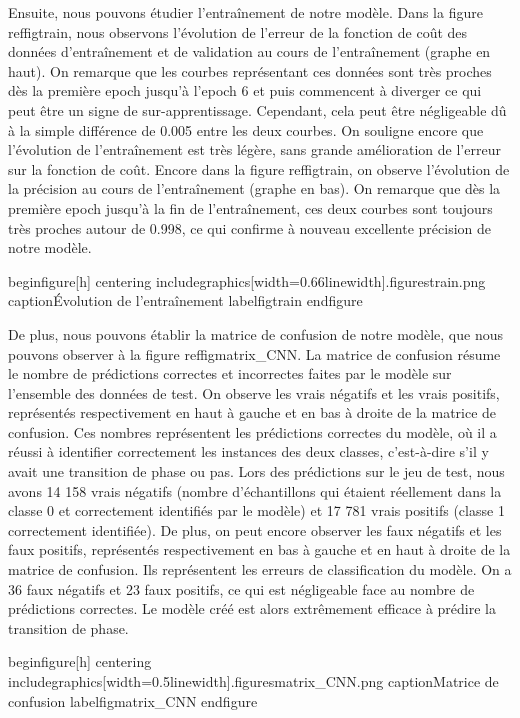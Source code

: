 Ensuite, nous pouvons étudier l’entraînement de notre modèle. Dans la figure ref{figtrain}, nous observons l’évolution de l’erreur de la fonction de coût des données d’entraînement et de validation au cours de l’entraînement (graphe en haut). On remarque que les courbes représentant ces données sont très proches dès la première epoch jusqu’à l’epoch 6 et puis commencent à diverger ce qui peut être un signe de sur-apprentissage. Cependant, cela peut être négligeable dû à la simple différence de 0.005 entre les deux courbes. On souligne encore que l’évolution de l’entraînement est très légère, sans grande amélioration de l’erreur sur la fonction de coût. Encore dans la figure ref{figtrain}, on observe l’évolution de la précision au cours de l’entraînement (graphe en bas). On remarque que dès la première epoch jusqu’à la fin de l’entraînement, ces deux courbes sont toujours très proches autour de 0.998, ce qui confirme à nouveau excellente précision de notre modèle.

begin{figure}[h]
	centering
	includegraphics[width=0.66linewidth]{.figurestrain.png}
	caption{Évolution de l'entraînement}
	label{figtrain}
end{figure}

De plus, nous pouvons établir la matrice de confusion de notre modèle, que nous pouvons observer à la figure ref{figmatrix_CNN}. La matrice de confusion résume le nombre de prédictions correctes et incorrectes faites par le modèle sur l’ensemble des données de test. On observe les vrais négatifs et les vrais positifs, représentés respectivement en haut à gauche et en bas à droite de la matrice de confusion. Ces nombres représentent les prédictions correctes du modèle, où il a réussi à identifier correctement les instances des deux classes,  c’est-à-dire s’il y avait une transition de phase ou pas. Lors des prédictions sur le jeu de test, nous avons 14 158 vrais négatifs (nombre d’échantillons qui étaient réellement dans la classe 0 et correctement identifiés par le modèle) et 17 781 vrais positifs (classe 1 correctement identifiée). De plus, on peut encore observer les faux négatifs et les faux positifs, représentés respectivement en bas à gauche et en haut à droite de la matrice de confusion. Ils représentent les erreurs de classification du modèle. On a 36 faux négatifs et 23 faux positifs, ce qui est négligeable face au nombre de prédictions correctes. Le modèle créé est alors extrêmement efficace à prédire la transition de phase.

begin{figure}[h]
	centering
	includegraphics[width=0.5linewidth]{.figuresmatrix_CNN.png}
	caption{Matrice de confusion}
	label{figmatrix_CNN}
end{figure}

